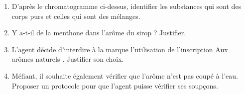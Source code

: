 \begin{enumerate}
\item \rea{} D'après le chromatogramme ci-dessus, identifier les substances qui sont des corps purs et celles qui sont des mélanges.
\item \rea{} Y a-t-il de la menthone dans l'arôme du sirop ? Justifier.
\item \val{} L'agent décide d'interdire à la marque l'utilisation de l'inscription \og Aux arômes naturels \fg{}.
Justifier son choix.
\item \anarai{} Méfiant, il souhaite également vérifier que l'arôme n'est pas coupé à l'eau.
Proposer un protocole pour que l'agent puisse vérifier ses soupçons.
\end{enumerate}